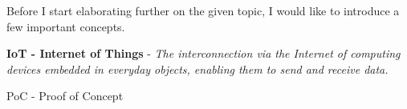 \linebreak
Before I start elaborating further on the given topic, I would like to introduce a few important concepts.

\textbf{IoT - Internet of Things} - \textit{The interconnection via the Internet of computing devices embedded in everyday objects, enabling them to send and receive data.}\cite{IoT-dictionary}

PoC - Proof of Concept
